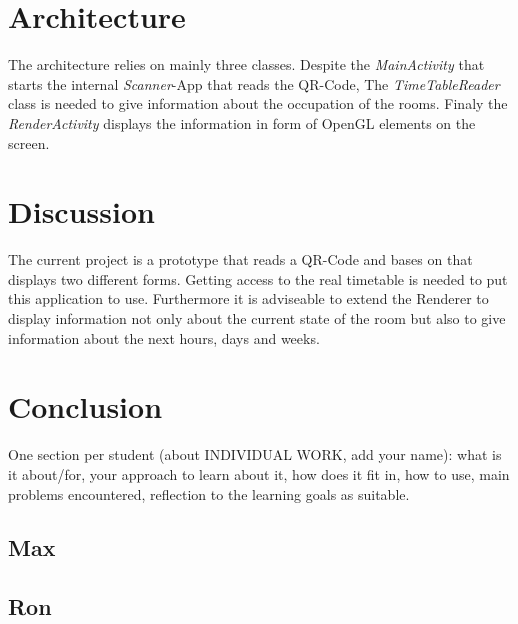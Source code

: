 \documentclass[]{article}
\begin{document}
\section{Architecture}
The architecture relies on mainly three classes. Despite the \emph{MainActivity} that starts the internal \emph{Scanner}-App that reads the QR-Code, The \emph{TimeTableReader} class is needed to give information about the occupation of the rooms. Finaly the \emph{RenderActivity} displays the information in form of OpenGL elements on the screen.   
\section{Discussion}
The current project is a prototype that reads a QR-Code and bases on that displays two different forms. Getting access to the real timetable is needed to put this application to use. Furthermore it is adviseable to extend the Renderer to display information not only about the current state of the room but also to give information about the next hours, days and weeks.  
\section{Conclusion}
One section per student (about INDIVIDUAL WORK, add your name): what is it about/for,
your approach to learn about it, how does it fit in, how to use, main problems encountered,
reflection to the learning goals as suitable.
\subsection{Max}
\subsection{Ron}
\end{document}
